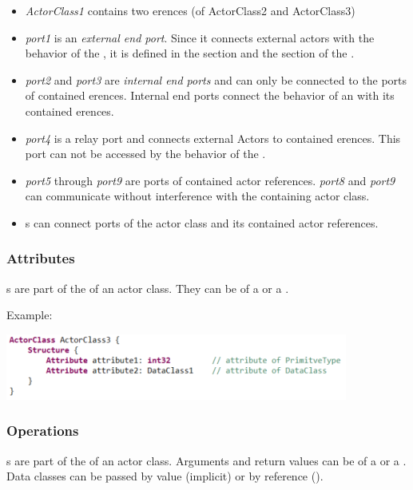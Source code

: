 \begin{itemize}
\item \textit{ActorClass1} contains two erences (of ActorClass2 and ActorClass3)
\item \textit{port1} is an \textit{external end port}. Since it connects external actors with the behavior 
of the , it is defined in the  section and the  section of 
the .
\item \textit{port2} and \textit{port3} are \textit{internal end ports} and can only be connected to the 
ports of contained erences. Internal end ports connect the behavior of an  with its 
contained erences.
\item \textit{port4} is a relay port and connects external Actors to contained erences. This port 
can not be accessed by the behavior of the .
\item \textit{port5} through \textit{port9} are ports of contained actor references. \textit{port8} and 
\textit{port9} can communicate without interference with the containing actor class.
\item {}s can connect ports of the actor class and its contained actor references. 
\end{itemize}

\subsubsection{Attributes}

s are part of the  of an actor class.
They can be of a  or a .

Example:

\includegraphics{images/040-ActorClassAttributes.png}

\subsubsection{Operations}

s are part of the  of an actor class.  Arguments and return values can be of a 
 or a . Data classes can be passed by value (implicit) or by reference ().

